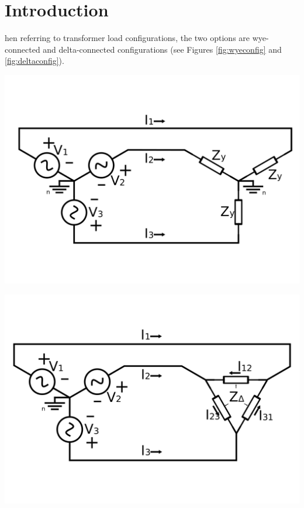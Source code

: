 \documentclass[journal]{IEEEtran}
\begin{document}
\section{Introduction}

\lowercase{hen} referring to transformer load configurations, the two options are wye-connected and  delta-connected configurations (see Figures \ref{fig:wyeconfig} and \ref{fig:deltaconfig}).

\begingroup
    \centering
    \medskip
    \includegraphics[width=\columnwidth]{images/lab9_3.png}
    \label{fig:wyeconfig}
\endgroup


\begingroup
    \centering
    \medskip
    \includegraphics[width=\columnwidth]{images/lab9_4.png}
    \label{fig:deltaconfig}
\endgroup
\end{document}

